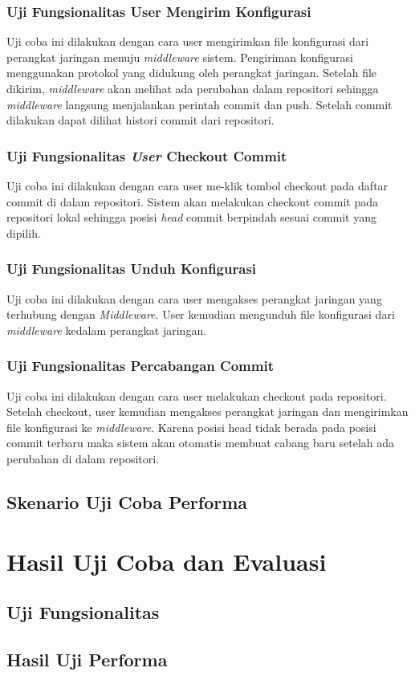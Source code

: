     	\subsubsection{Uji Fungsionalitas User Mengirim Konfigurasi}
    	Uji coba ini dilakukan dengan cara user mengirimkan file konfigurasi dari perangkat jaringan menuju \textit{middleware} sistem. Pengiriman konfigurasi menggunakan protokol yang didukung oleh perangkat jaringan. Setelah file dikirim, \textit{middleware} akan melihat ada perubahan dalam repositori sehingga \textit{middleware} langsung menjalankan perintah commit dan push. Setelah commit dilakukan dapat dilihat histori commit dari repositori.
    	
    	\subsubsection{Uji Fungsionalitas \textit{User} Checkout Commit}
    	Uji coba ini dilakukan dengan cara user me-klik tombol checkout pada daftar commit di dalam repositori. Sistem akan melakukan checkout commit pada repositori lokal sehingga posisi \textit{head} commit berpindah sesuai commit yang dipilih.
    	
    	\subsubsection{Uji Fungsionalitas Unduh Konfigurasi}
    	Uji coba ini dilakukan dengan cara user mengakses perangkat jaringan yang terhubung dengan \textit{Middleware}. User kemudian mengunduh file konfigurasi dari \textit{middleware} kedalam perangkat jaringan. 
    	
    	\subsubsection{Uji Fungsionalitas Percabangan Commit}
    	Uji coba ini dilakukan dengan cara user melakukan checkout pada repositori. Setelah checkout, user kemudian mengakses perangkat jaringan dan mengirimkan file konfigurasi ke \textit{middleware}. Karena posisi head tidak berada pada posisi commit terbaru maka sistem akan otomatis membuat cabang baru setelah ada perubahan di dalam repositori.
    	 
    \subsection{Skenario Uji Coba Performa}
    	
    
\section{Hasil Uji Coba dan Evaluasi}
	
	\subsection{Uji Fungsionalitas}
    
   	
    \subsection{Hasil Uji Performa}
    	